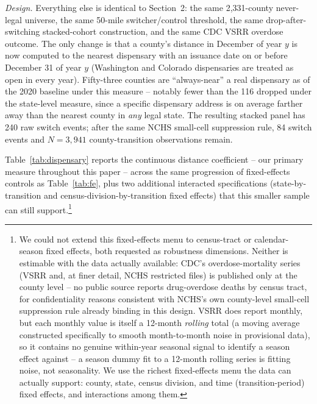 \documentclass[preprint,12pt,authoryear]{elsarticle}
\begin{document}
\emph{Design.} Everything else is identical to Section~2: the same
2,331-county never-legal universe, the same 50-mile switcher/control
threshold, the same drop-after-switching stacked-cohort construction,
and the same CDC VSRR overdose outcome. The only change is that a
county's distance in December of year $y$ is now computed to the
nearest dispensary with an issuance date on or before December 31 of
year $y$ (Washington and Colorado dispensaries are treated as
open in every year). Fifty-three counties are ``always-near'' a real
dispensary as of the 2020 baseline under this measure -- notably fewer
than the 116 dropped under the state-level measure, since a specific
dispensary address is on average farther away than the nearest county
in \emph{any} legal state. The resulting stacked panel has 240 raw
switch events; after the same NCHS small-cell suppression rule, 84
switch events and $N=3{,}941$ county-transition observations remain.

Table~\ref{tab:dispensary} reports the continuous distance coefficient
-- our primary measure throughout this paper -- across the same
progression of fixed-effects controls as Table~\ref{tab:fe}, plus two
additional interacted specifications (state-by-transition and
census-division-by-transition fixed effects) that this smaller sample
can still support.\footnote{We could not extend this fixed-effects
menu to census-tract or calendar-season fixed effects, both requested
as robustness dimensions. Neither is estimable with the data actually
available: CDC's overdose-mortality series (VSRR and, at finer detail,
NCHS restricted files) is published only at the county level -- no
public source reports drug-overdose deaths by census tract, for
confidentiality reasons consistent with NCHS's own county-level
small-cell suppression rule already binding in this design. VSRR does
report monthly, but each monthly value is itself a 12-month
\emph{rolling} total (a moving average constructed specifically to
smooth month-to-month noise in provisional data), so it contains no
genuine within-year seasonal signal to identify a season effect
against -- a season dummy fit to a 12-month rolling series is fitting
noise, not seasonality. We use the richest fixed-effects menu the data
can actually support: county, state, census division, and
time (transition-period) fixed effects, and interactions among them.}
\end{document}
